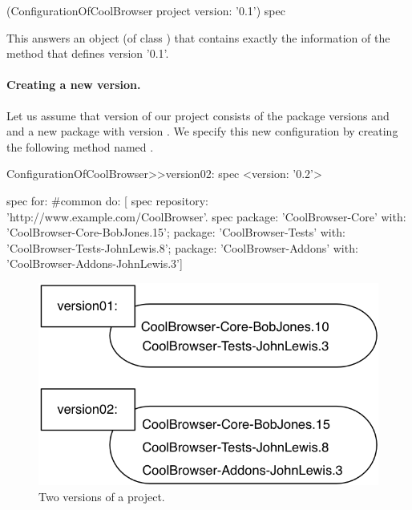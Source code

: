 \documentclass[a4paper,10pt,twoside]{book}
\begin{document}
\begin{code}{}
	(ConfigurationOfCoolBrowser project version: '0.1') spec
\end{code}

This  answers an object (of class ) that contains exactly the information of the method that defines version '0.1'.





\paragraph{Creating a new version.}
Let us assume that version  of our project consists of the package versions \mbox{} and \mbox{} and a new package  with version . We specify this new configuration by creating the following method named .

\begin{code}{}
ConfigurationOfCoolBrowser>>version02: spec 
      <version: '0.2'>
       
      spec for: #common do: [
            spec repository: 'http://www.example.com/CoolBrowser'.
            spec 
                  package: 'CoolBrowser-Core' with: 'CoolBrowser-Core-BobJones.15';
                  package: 'CoolBrowser-Tests' with: 'CoolBrowser-Tests-JohnLewis.8';
                  package: 'CoolBrowser-Addons' with: 'CoolBrowser-Addons-JohnLewis.3']
\end{code}
 
\begin{figure}
\begin{center}
\includegraphics[width=0.6\linewidth]{version02}
\caption{Two versions of a project.}
\end{center}
\end{figure} 
 
\end{document}
